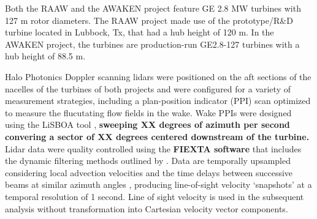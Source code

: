 \documentclass[%
 aip,
 amsmath,
 amssymb,
preprint,%
]{revtex4-2}
\begin{document}
Both the RAAW and the AWAKEN project feature GE 2.8 MW turbines with 127 m rotor diameters. The RAAW project made use of the prototype/R\&D turbine located in Lubbock, Tx, that had a hub height of 120 m. In the AWAKEN project, the turbines are production-run GE2.8-127 turbines with a hub height of 88.5 m. 

Halo Photonics Doppler scanning lidars were positioned on the aft sections of the nacelles of the turbines of both projects and were configured for a variety of measurement strategies, including a plan-position indicator (PPI) scan optimized to measure the flucutating flow fields in the wake.
Wake PPIs were designed using the LiSBOA tool \cite{letizia2021lisboa}, \textbf{sweeping XX degrees of azimuth per second convering a sector of XX degrees centered downstream of the turbine.}
Lidar data were quality controlled using the \textbf{FIEXTA software} \cite{} that includes the dynamic filtering methods outlined by \citet{beckDynamicDataFiltering2017}.
Data are temporally upsampled considering local advection velocities and the time delays between successive beams at similar azimuth angles \cite{beckTemporalUpSamplingPlanar2019}, producing line-of-sight velocity `snapshots' at a temporal resolution of 1 second.
Line of sight velocity is used in the subsequent analysis without transformation into Cartesian velocity vector components.
\end{document}
